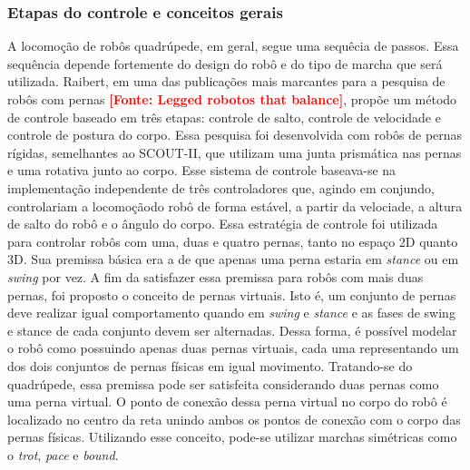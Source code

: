 \documentclass[../main.tex]{subfiles}
\begin{document}
  \subsubsection{Etapas do controle e conceitos gerais}
  A locomoção de robôs quadrúpede, em geral, segue uma sequêcia de passos. Essa sequência depende fortemente do design do robô e do tipo de marcha que será utilizada. Raibert, em uma das publicações mais marcantes para a pesquisa de robôs com pernas \textbf{\textcolor{red}{[Fonte: Legged robotos that balance]}}, propõe um método de controle baseado em três etapas: controle de salto, controle de velocidade e controle de postura do corpo. Essa pesquisa foi desenvolvida com robôs de pernas rígidas, semelhantes ao SCOUT-II, que utilizam uma junta prismática nas pernas e uma rotativa junto ao corpo. Esse sistema de controle baseava-se na implementação independente de três controladores que, agindo em conjundo, controlariam a locomoçãodo robô de forma estável, a partir da velociade, a altura de salto do robô e o ângulo do corpo. Essa estratégia de controle foi utilizada para controlar robôs com uma, duas e quatro pernas, tanto no espaço 2D quanto 3D. Sua premissa básica era a de que apenas uma perna estaria em \textit{stance} ou em \textit{swing} por vez. A fim da satisfazer essa premissa para robôs com mais duas pernas, foi proposto o conceito de pernas virtuais. Isto é, um conjunto de pernas deve realizar igual comportamento quando em \textit{swing} e \textit{stance} e as fases de swing e stance de cada conjunto devem ser alternadas. Dessa forma, é possível modelar o robô como possuindo apenas duas pernas virtuais, cada uma representando um dos dois conjuntos de pernas físicas em igual movimento. Tratando-se do quadrúpede, essa premissa pode ser satisfeita considerando duas pernas como uma perna virtual. O ponto de conexão dessa perna virtual no corpo do robô é localizado no centro da reta unindo ambos os pontos de conexão com o corpo das pernas físicas. Utilizando esse conceito, pode-se utilizar marchas simétricas como o \textit{trot}, \textit{pace} e \textit{bound}.
\end{document}
